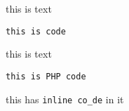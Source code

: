 this is text

\begin{lstlisting}
this is code
\end{lstlisting}
this is text

\begin{lstlisting}
this is PHP code
\end{lstlisting}
this has \verb`inline co_de` in it

